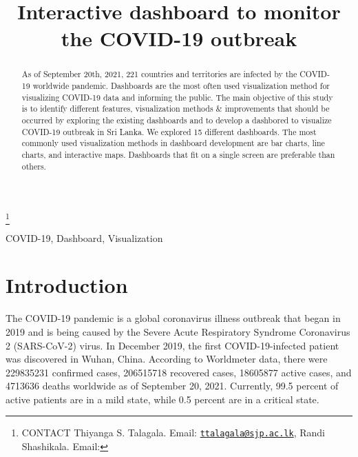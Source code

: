 \documentclass[]{interact}
\theoremstyle{plain}%
\theoremstyle{definition}
\theoremstyle{remark}
\begin{document}
\articletype{}

\title{Interactive dashboard to monitor the COVID-19 outbreak}


\author{
}

\thanks{CONTACT Thiyanga S.
Talagala. Email: \href{mailto:ttalagala@sjp.ac.lk}{\nolinkurl{ttalagala@sjp.ac.lk}}, Randi
Shashikala. Email: }

\maketitle

\begin{abstract}
As of September 20th, 2021, 221 countries and territories are infected
by the COVID-19 worldwide pandemic. Dashboards are the most often used
visualization method for visualizing COVID-19 data and informing the
public. The main objective of this study is to identify different
features, visualization methods \& improvements that should be occurred
by exploring the existing dashboards and to develop a dashbored to
visualize COVID-19 outbreak in Sri Lanka. We explored 15 different
dashboards. The most commonly used visualization methods in dashboard
development are bar charts, line charts, and interactive maps.
Dashboards that fit on a single screen are preferable than others.
\end{abstract}

\begin{keywords}
COVID-19, Dashboard, Visualization
\end{keywords}

\hypertarget{introduction}{%
\section{Introduction}\label{introduction}}

The COVID-19 pandemic is a global coronavirus illness outbreak that
began in 2019 and is being caused by the Severe Acute Respiratory
Syndrome Coronavirus 2 (SARS-CoV-2) virus. In December 2019, the first
COVID-19-infected patient was discovered in Wuhan, China. According to
Worldmeter data, there were 229835231 confirmed cases, 206515718
recovered cases, 18605877 active cases, and 4713636 deaths worldwide as
of September 20, 2021. Currently, 99.5 percent of active patients are in
a mild state, while 0.5 percent are in a critical state.
\end{document}
